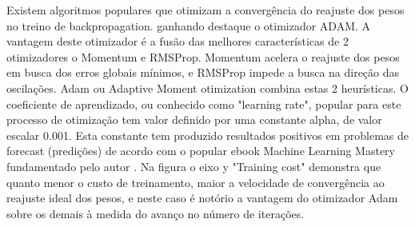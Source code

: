         Existem algoritmos populares que otimizam a convergência do reajuste dos pesos no treino de backpropagation. ganhando destaque o otimizador ADAM. A vantagem deste otimizador é a fusão das melhores características de 2 otimizadores o Momentum e RMSProp. Momentum acelera o reajuste dos pesos em busca dos erros globais mínimos, e RMSProp impede a busca na direção das oscilações.\newline
         Adam ou Adaptive Moment otimization combina estas 2 heurísticas. O coeficiente de aprendizado, ou conhecido como "learning rate", popular para este processo de otimização tem valor definido por uma constante alpha, de valor escalar 0.001.
        Esta constante tem produzido resultados positivos em problemas de forecast (predições) de acordo com o popular ebook Machine Learning Mastery fundamentado pelo autor \cite{MLM}. Na figura \label{fig:otimizadores} o eixo y "Training cost" demonstra que quanto menor o custo de treinamento, maior a velocidade de convergência ao reajuste ideal dos pesos, e neste caso é notório a vantagem do otimizador Adam sobre os demais à medida do avanço no número de iterações.
        \begin{figure}[H]
        	 \label{fig:otimizadores}
        \end{figure}
            
